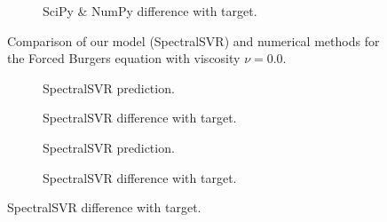 \begin{figure}[H]
\begin{adjustwidth}{-0.05\linewidth}{-0.05\linewidth}
\begin{subfigure}{0.49\linewidth}
    \end{subfigure}
    \begin{subfigure}{0.49\linewidth}
      \begin{adjustbox}{width=\linewidth}
        
      \end{adjustbox}
      \caption{SciPy \& NumPy difference with target.}\label{fig:comp_spo_diff_0.0}
    \end{subfigure}
  \end{adjustwidth}
  \caption{Comparison of our model (SpectralSVR) and numerical methods for the Forced Burgers equation with viscosity \(\nu=0.0\).}\label{fig:comparison_burgers_0.0}
\end{figure}

\begin{figure}[H]
  \centering
  \begin{adjustwidth}{-0.05\linewidth}{-0.05\linewidth}
    \begin{subfigure}{0.49\linewidth}
      \begin{adjustbox}{width=\linewidth}
        
      \end{adjustbox}
      \caption{SpectralSVR prediction.}\label{fig:comp_lssvr_pred_0.01}
    \end{subfigure}
    \begin{subfigure}{0.49\linewidth}
      \begin{adjustbox}{width=\linewidth}
        
      \end{adjustbox}
      \caption{SpectralSVR difference with target.}\label{fig:comp_lssvr_diff_0.01}
    \end{subfigure}
    \begin{subfigure}{0.49\linewidth}
      \begin{adjustbox}{width=\linewidth}
        
      \end{adjustbox}
      \caption{SpectralSVR prediction.}\label{fig:comp_fnn_pred_0.01}
    \end{subfigure}
    \begin{subfigure}{0.49\linewidth}
      \begin{adjustbox}{width=\linewidth}
        
      \end{adjustbox}
      \caption{SpectralSVR difference with target.}\label{fig:comp_fnn_diff_0.01}

\end{subfigure}
\end{adjustwidth}
\end{figure}

